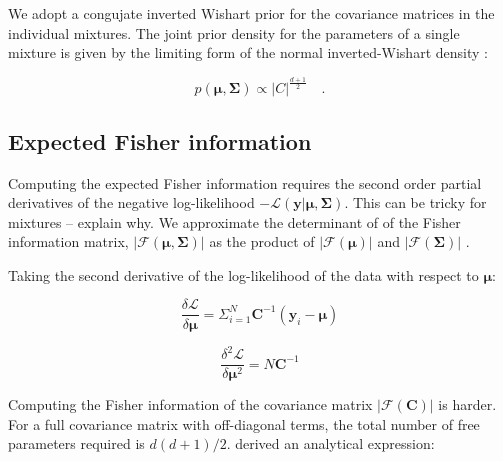 \documentclass{aastex61}
\begin{document}
We adopt a congujate inverted Wishart prior for the covariance matrices in the
individual mixtures. The joint prior density for the parameters of a single
mixture is given by the limiting form of the normal inverted-Wishart
density \citep[e.g., Section 5.2.3 of ][]{Schafer_1990}:


\begin{equation}
    p(\bm{\mu},\bm{\Sigma}) \propto |C|^{\frac{d + 1}{2}} \quad .
\end{equation}



\subsection{Expected Fisher information}

Computing the expected Fisher information requires the second order partial
derivatives of the negative log-likelihood $-\mathcal{L}(\bm{y}|\bm{\mu},\bm{\Sigma})$.
This can be tricky for mixtures -- explain why.
We approximate the determinant of of the Fisher information matrix,
$|\mathcal{F}(\bm{\mu},\bm{\Sigma})|$ as the product of $|\mathcal{F}\left(\bm{\mu}\right)|$ and $|\mathcal{F}\left(\bm{\Sigma}\right)|$ \citep{Oliver_1996,Roberts_1998}.


Taking the second derivative of the log-likelihood of the data with respect to $\bm{\mu}$:

\begin{equation}
\frac{\delta\mathcal{L}}{\delta\bm{\mu}} = \Sigma_{i=1}^{N}\bm{C}^{-1}(\bm{y}_i - \bm{\mu})
\end{equation}

\begin{equation}
\frac{\delta^2\mathcal{L}}{\delta\bm{\mu}^2} = N\bm{C}^{-1}
\end{equation}


Computing the Fisher information of the covariance matrix $|\mathcal{F}\left(\bm{C}\right)|$ is harder. For a full covariance matrix with off-diagonal terms, the total
number of free parameters required is $d(d+1)/2$.
\citep{Magnus_1988} derived an analytical expression:
\end{document}
